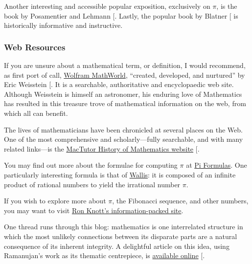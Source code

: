 \documentclass[
  a4paper,
]{article}
\begin{document}
Another interesting and accessible popular exposition, exclusively on
\(\pi\), is the book by Posamentier and Lehmann
{[}\citeproc{ref-pos-leh-2004}{48}{]}. Lastly, the popular book by
Blatner {[}\citeproc{ref-blatner-1997}{46}{]} is historically
informative and instructive.

\subsubsection{Web Resources}\label{web-resources}

If you are unsure about a mathematical term, or definition, I would
recommend, as first port of call,
\href{https://mathworld.wolfram.com/}{Wolfram MathWorld}, ``created,
developed, and nurtured'' by Eric Weisstein
{[}\citeproc{ref-mathworld}{49}{]}. It is a searchable, authoritative
and encyclopaedic web site. Although Weisstein is himself an astronomer,
his enduring love of Mathematics has resulted in this treasure trove of
mathematical information on the web, from which all can benefit.

The lives of mathematicians have been chronicled at several places on
the Web. One of the most comprehensive and scholarly---fully searchable,
and with many related links---is the
\href{https://mathshistory.st-andrews.ac.uk/}{MacTutor History of
Mathematics website} {[}\citeproc{ref-mactutor}{50}{]}.

You may find out more about the formulae for computing \(\pi\) at
\href{https://mathworld.wolfram.com/PiFormulas.html}{Pi Formulas}. One
particularly interesting formula is that of
\href{https://mathworld.wolfram.com/WallisFormula.html}{Wallis}: it is
composed of an infinite product of rational numbers to yield the
irrational number \(\pi\).

If you wish to explore more about \(\pi\), the Fibonacci sequence, and
other numbers, you may want to visit
\href{https://r-knott.surrey.ac.uk/fibonacci/fibpi.html\%7D\%7BRon\%20Knott's\%20information-packed\%20site}{Ron
Knott's information-packed site}.

One thread runs through this blog: mathematics is one interrelated
structure in which the most unlikely connections between its disparate
parts are a natural consequence of its inherent integrity. A delightful
article on this idea, using Ramanujan's work as its thematic
centrepiece, is
\href{https://www.quantamagazine.org/srinivasa-ramanujan-was-a-genius-math-is-still-catching-up-20241021/}{available
online} {[}\citeproc{ref-ramanujan-quanta}{51}{]}.
\end{document}
